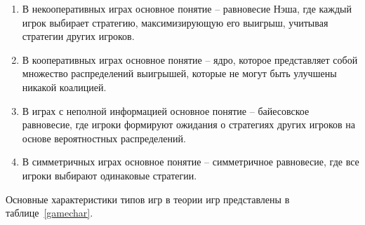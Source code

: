 \begin{enumerate}[label=\arabic*)] %
\item В некооперативных играх основное понятие -- равновесие Нэша, где каждый игрок выбирает стратегию, максимизирующую его выигрыш, учитывая стратегии других игроков.

\item В кооперативных играх основное понятие -- ядро, которое представляет собой множество распределений выигрышей, которые не могут быть улучшены никакой коалицией.

\item В играх с неполной информацией основное понятие -- байесовское равновесие, где игроки формируют ожидания о стратегиях других игроков на основе вероятностных распределений.

\item В симметричных играх основное понятие -- симметричное равновесие, где все игроки выбирают одинаковые стратегии.
\end{enumerate}

Основные характеристики типов игр в теории игр представлены в таблице~\ref{gamechar}. 


